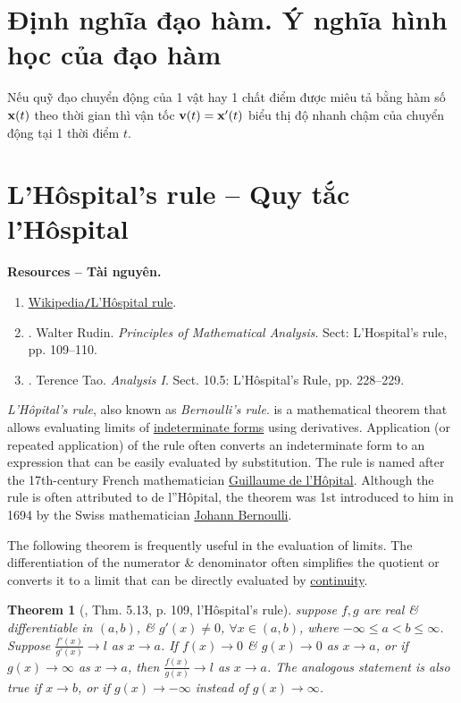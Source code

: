 \documentclass[oneside]{book}
\newtheorem{theorem}{Theorem}
\begin{document}
\section{Định nghĩa đạo hàm. Ý nghĩa hình học của đạo hàm}
Nếu quỹ đạo chuyển động của 1 vật hay 1 chất điểm được miêu tả bằng hàm số ${\bf x}(t)$ theo thời gian thì vận tốc ${\bf v}(t) = {\bf x}'(t)$ biểu thị độ nhanh chậm của chuyển động tại 1 thời điểm $t$.


\section{L'H\^ospital's rule -- Quy tắc l'H\^ospital}
\textbf{\textsf{Resources -- Tài nguyên.}}
\begin{enumerate}
	\item \href{https://en.wikipedia.org/wiki/L%27H%C3%B4pital%27s_rule}{Wikipedia{\tt/}L'H\^ospital rule}.
	\item \cite{Rudin1976}. {\sc Walter Rudin}. {\it Principles of Mathematical Analysis}. Sect: L'Hospital's rule, pp. 109--110.
	\item \cite{Tao_analysis_1}. {\sc Terence Tao}. {\it Analysis I}. Sect. 10.5: L'H\^ospital's Rule, pp. 228--229.
\end{enumerate}
{\it L'Hôpital's rule}, also known as {\it Bernoulli's rule}. is a mathematical theorem that allows evaluating limits of \href{https://en.wikipedia.org/wiki/Indeterminate_form}{indeterminate forms} using derivatives. Application (or repeated application) of the rule often converts an indeterminate form to an expression that can be easily evaluated by substitution. The rule is named after the 17th-century French mathematician \href{https://en.wikipedia.org/wiki/Guillaume_de_l%27H%C3%B4pital}{Guillaume de l'H\^opital}. Although the rule is often attributed to de l''H\^opital, the theorem was 1st introduced to him in 1694 by the Swiss mathematician \href{https://en.wikipedia.org/wiki/Johann_Bernoulli}{\sc Johann Bernoulli}.

The following theorem is frequently useful in the evaluation of limits. The differentiation of the numerator \& denominator often simplifies the quotient or converts it to a limit that can be directly evaluated by \href{https://en.wikipedia.org/wiki/Continuous_function}{continuity}.

\begin{theorem}[\cite{Rudin1976}, Thm. 5.13, p. 109, l'H\^ospital's rule]
	\label{thm: l'H\^ospital rule}
	suppose $f,g$ are real \& differentiable in $(a,b)$, \& $g'(x)\ne0$, $\forall x\in(a,b)$, where $-\infty\le a < b\le\infty$. Suppose $\frac{f'(x)}{g'(x)}\to l$ as $x\to a$. If $f(x)\to0$ \& $g(x)\to0$ as $x\to a$, or if $g(x)\to\infty$ as $x\to a$, then $\frac{f(x)}{g(x)}\to l$ as $x\to a$. The analogous statement is also true if $x\to b$, or if $g(x)\to-\infty$ instead of $g(x)\to\infty$.
\end{theorem}
\end{document}
